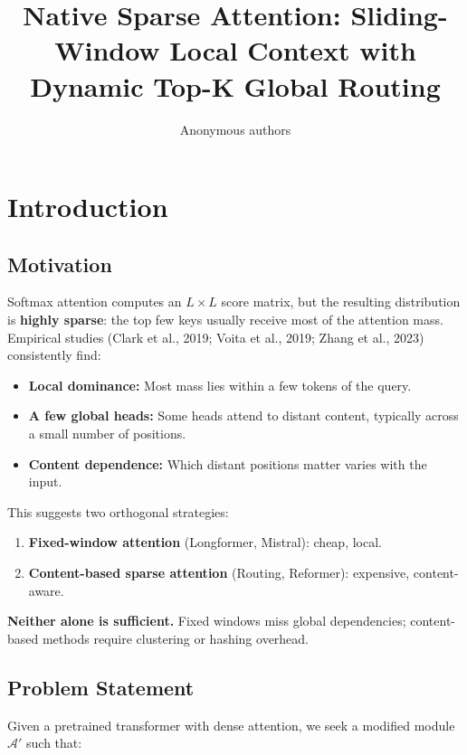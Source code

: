 \title{\textbf{Native Sparse Attention: Sliding-Window Local Context with Dynamic Top-K Global Routing}}

\author{Anonymous authors}



\section{Introduction}

\subsection{Motivation}

Softmax attention computes an $L \times L$ score matrix, but the resulting 
distribution is \textbf{highly sparse}: the top few keys usually receive most 
of the attention mass. Empirical studies (Clark et al., 2019; Voita et al., 
2019; Zhang et al., 2023) consistently find:

\begin{itemize}
\item \textbf{Local dominance:} Most mass lies within a few tokens of the query.
\item \textbf{A few global heads:} Some heads attend to distant content, typically
  across a small number of positions.
\item \textbf{Content dependence:} Which distant positions matter varies with the
  input.

\end{itemize}
This suggests two orthogonal strategies:

\begin{enumerate}
\item \textbf{Fixed-window attention} (Longformer, Mistral): cheap, local.
\item \textbf{Content-based sparse attention} (Routing, Reformer): expensive,
  content-aware.

\end{enumerate}
\textbf{Neither alone is sufficient.} Fixed windows miss global dependencies; 
content-based methods require clustering or hashing overhead.

\subsection{Problem Statement}

Given a pretrained transformer with dense attention, we seek a modified 
module $\mathcal{A}'$ such that:

